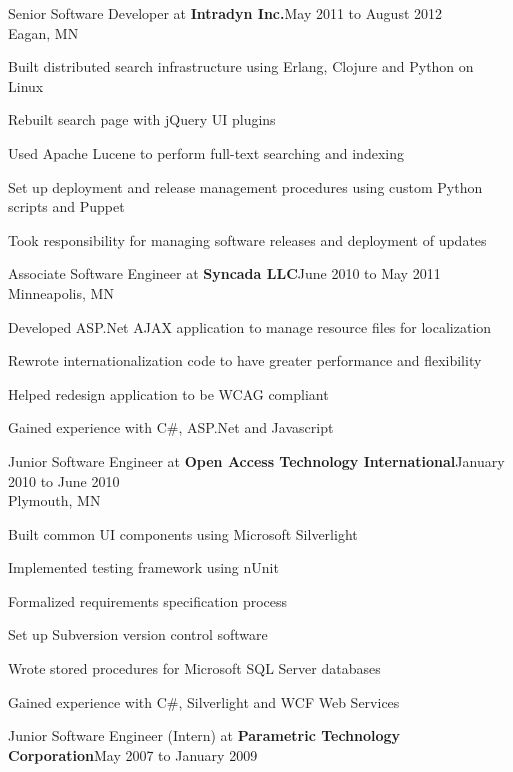 \documentclass[letterpaper]{article}
\newenvironment{resume-list}
{\begin{itemize}
 \setlength{\itemsep}{0pt}
 \setlength{\parskip}{0pt}}
{\end{itemize}}
\begin{document}
\pagebreak
\noindent Senior Software Developer at {\bfseries Intradyn Inc.}\dotfill May 2011 to August 2012\\
Eagan, MN
\begin{resume-list}
\item Built distributed search infrastructure using Erlang, Clojure and Python on Linux
\item Rebuilt search page with jQuery UI plugins
\item Used Apache Lucene to perform full-text searching and indexing
\item Set up deployment and release management procedures using custom Python scripts and Puppet
\item Took responsibility for managing software releases and deployment of updates
\end{resume-list}
\noindent Associate Software Engineer at {\bfseries Syncada LLC}\dotfill June 2010 to May 2011\\
Minneapolis, MN
\begin{resume-list}
\item Developed ASP.Net AJAX application to manage resource files for localization
\item Rewrote internationalization code to have greater performance and flexibility
\item Helped redesign application to be WCAG compliant
\item Gained experience with C\#, ASP.Net and Javascript
\end{resume-list}
\noindent Junior Software Engineer at {\bfseries Open Access Technology International}\dotfill January 2010 to June 2010\\
Plymouth, MN
\begin{resume-list}
\item Built common UI components using Microsoft Silverlight
\item Implemented testing framework using nUnit
\item Formalized requirements specification process
\item Set up Subversion version control software
\item Wrote stored procedures for Microsoft SQL Server databases
\item Gained experience with C\#, Silverlight and WCF Web Services
\end{resume-list}
\noindent Junior Software Engineer (Intern) at {\bfseries Parametric Technology Corporation}\dotfill May 2007 to January 2009\\
\end{document}
